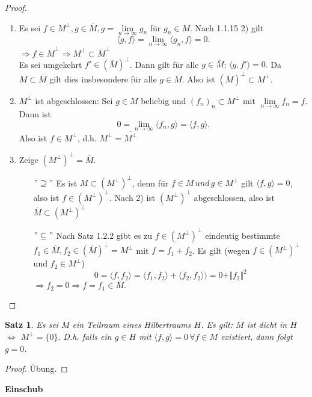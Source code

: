 \documentclass[12pt,titlepage]{article}
\newtheorem{satz}[zahl]{Satz}
\numberwithin{equation}{section}
\begin{document}
\begin{proof}
\begin{enumerate}
\item Es sei $f \in M^{\perp},g\in \overline{M},g=\underset{n \rightarrow \infty}{\lim} g_n$ für $ g_n\in M$. Nach 1.1.15 2) gilt
\[
\langle g,f \rangle= \underset{n \rightarrow \infty}{\lim} \langle g_n, f \rangle =0.
\]
$\Rightarrow f\in \overline{M}^{\perp}\Rightarrow M^{\perp} \subset \overline{M}^{\perp}$\\
Es sei umgekehrt $f'\in (\overline{M})^{\perp}$. Dann gilt für alle $g \in \overline{M}$: $\langle g,f' \rangle=0.$ Da $M \subset \overline{M}$ gilt dies insbesondere für alle $g \in M$. Also ist $(\overline{M})^{\perp}\subset M^{\perp}.$
\item $M^{\perp}$ ist abgeschlossen: Sei $g\in M$ beliebig und $(f_n)_n\subset M^{\perp}$ mit $\underset{n \rightarrow \infty }{\lim}f_n=f.$ Dann ist 
\[
0=\underset{n \rightarrow \infty }{\lim} \langle f_n, g\rangle=\langle f,g \rangle.
\] Also ist $f\in M^{\perp}$, d.h. $M^{\perp}=\overline{{M^{\perp}}}$
\item Zeige $(M^{\perp})^{\perp}=\overline{M}.$
\begin{itemize}
\item[$"\supseteq "$] Es ist $M \subset (M^{\perp})^{\perp}$,  denn für $f \in M \, und \,g\in M^{\perp}$ gilt $\langle f,g\rangle=0$, also ist $f \in (M^{\perp})^{\perp}$. Nach 2) ist $(M^{\perp})^{\perp}$ abgeschlossen, also ist $ \overline{M} \subset (M^{\perp})^{\perp}$ 
\item[$"\subseteq "$] Nach Satz 1.2.2 gibt es zu $f\in (M^{\perp})^{\perp}$ eindeutig bestimmte $f_1 \in \overline{M},f_2 \in (\overline{M})^{\perp}=M^{\perp}$ mit $f=f_1+f_2$. Es gilt (wegen $f\in (M^{\perp})^{\perp}$ und $f_2 \in M^{\perp}$)
\[
0 =\langle f,f_2 \rangle= \langle f_1, f_2 \rangle+ \langle f_2,f_2 \rangle )=0+ \Vert f_2 \Vert^2
\] 
$\Rightarrow f_2=0 \Rightarrow f=f_1 \in \overline{M}.$
\end{itemize}
\end{enumerate}
\end{proof}
\begin{satz}
Es sei $M$ ein Teilraum eines Hilbertraums $H$. Es gilt: $M$ ist dicht in $H$ $\Leftrightarrow$ $M^{\perp}=\{0\}.$ D.h. falls ein $g \in H$ mit $\langle f,g \rangle =0 \,\forall f\in M $ existiert, dann folgt $ g=0$.
\end{satz}
\begin{proof}
Übung.
\end{proof}
\textbf{Einschub}
\end{document}
